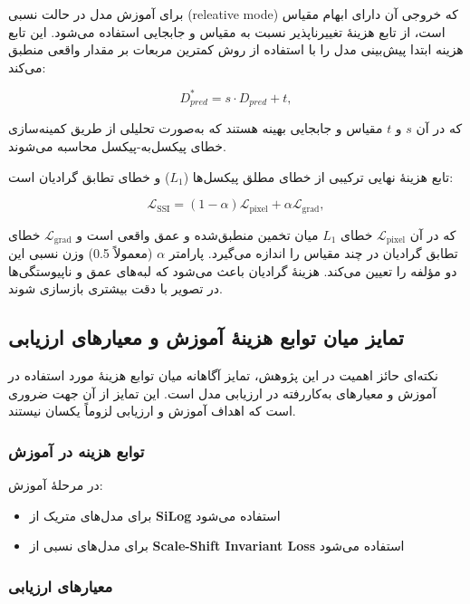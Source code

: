 برای آموزش مدل در حالت نسبی (releative mode) که خروجی آن دارای ابهام مقیاس است، از تابع هزینهٔ تغییرناپذیر نسبت به مقیاس و جابجایی استفاده می‌شود. این تابع هزینه ابتدا پیش‌بینی مدل را با استفاده از روش کمترین مربعات بر مقدار واقعی منطبق می‌کند:

\begin{equation}
D^*_{pred} = s \cdot D_{pred} + t,
\end{equation}

که در آن $s$ و $t$ مقیاس و جابجایی بهینه هستند که به‌صورت تحلیلی از طریق کمینه‌سازی خطای پیکسل‌به-پیکسل محاسبه می‌شوند.

تابع هزینهٔ نهایی ترکیبی از خطای مطلق پیکسل‌ها ($L_1$) و خطای تطابق گرادیان است:

\begin{equation}
\mathcal{L}_{\text{SSI}} = (1 - \alpha) \mathcal{L}_{\text{pixel}} + \alpha \mathcal{L}_{\text{grad}},
\end{equation}

که در آن $\mathcal{L}_{\text{pixel}}$ خطای $L_1$ میان تخمین منطبق‌شده و عمق واقعی است و $\mathcal{L}_{\text{grad}}$ خطای تطابق گرادیان در چند مقیاس را اندازه می‌گیرد. پارامتر $\alpha$ (معمولاً 0.5) وزن نسبی این دو مؤلفه را تعیین می‌کند. هزینهٔ گرادیان باعث می‌شود که لبه‌های عمق و ناپیوستگی‌ها در تصویر با دقت بیشتری بازسازی شوند.

\subsection{تمایز میان توابع هزینهٔ آموزش و معیارهای ارزیابی}

نکته‌ای حائز اهمیت در این پژوهش، تمایز آگاهانه میان توابع هزینهٔ مورد استفاده در آموزش و معیارهای به‌کاررفته در ارزیابی مدل است. این تمایز از آن جهت ضروری است که اهداف آموزش و ارزیابی لزوماً یکسان نیستند.

\subsubsection{توابع هزینه در آموزش}

در مرحلهٔ آموزش:
\begin{itemize}
    \item برای مدل‌های متریک از \textbf{SiLog} استفاده می‌شود
    \item برای مدل‌های نسبی از \textbf{Scale-Shift Invariant Loss} استفاده می‌شود
\end{itemize}

\subsubsection{معیارهای ارزیابی}

